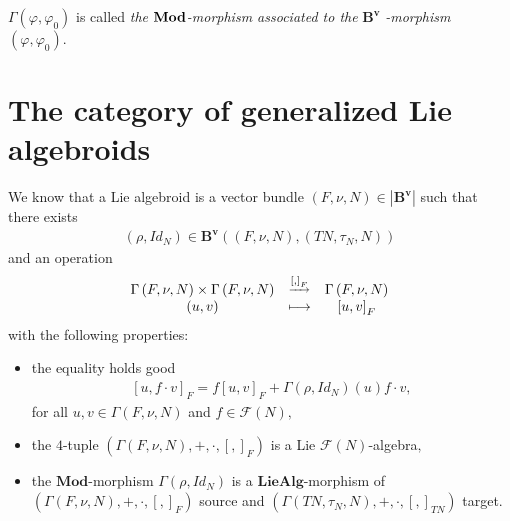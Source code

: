 \documentclass[11pt]{article}
\begin{document}
$\Gamma \left( \varphi ,\varphi _{0}\right) $ is called \emph{the }$\mathbf{%
Mod}$\emph{-morphism associated to the }$\mathbf{B}^{\mathbf{v}}$\emph{%
-morphism }$\left( \varphi ,\varphi _{0}\right) .$

\section{The category of generalized Lie algebroids}

We know that a Lie algebroid is a vector bundle $\left( F,\nu ,N\right) \in
\left\vert \mathbf{B}^{\mathbf{v}}\right\vert $ such that there exists
\begin{equation*}
\begin{array}{c}
\left( \rho ,Id_{N}\right) \in \mathbf{B}^{\mathbf{v}}\left( \left( F,\nu
,N\right) ,\left( TN,\tau _{N},N\right) \right)%
\end{array}%
\end{equation*}%
and an operation
\begin{equation*}
\begin{array}{ccc}
\Gamma \left( F,\nu ,N\right) \times \Gamma \left( F,\nu ,N\right) & ^{%
\underrightarrow{\,\left[ ,\right] _{F}\,}} & \Gamma \left( F,\nu ,N\right)
\\
\left( u,v\right) & \longmapsto & \left[ u,v\right] _{F}%
\end{array}%
\end{equation*}%
with the following properties:

\begin{itemize}
\item[$LA_{1}$.] the equality holds good
\begin{equation*}
\begin{array}{c}
\left[ u,f\cdot v\right] _{F}=f\left[ u,v\right] _{F}+\Gamma \left( \rho
,Id_{N}\right) \left( u\right) f\cdot v,%
\end{array}%
\end{equation*}%
for all $u,v\in \Gamma \left( F,\nu ,N\right) $ and $f\in \mathcal{F}\left(
N\right) ,$

\item[$LA_{2}$.] the $4$-tuple $\left( \Gamma \left( F,\nu ,N\right)
,+,\cdot ,\left[ ,\right] _{F}\right) $ is a Lie $\mathcal{F}\left( N\right)
$-algebra$,$

\item[$LA_{3}$.] the $\mathbf{Mod}$-morphism $\Gamma \left( \rho
,Id_{N}\right) $ is a $\mathbf{LieAlg}$-morphism of $\left( \Gamma \left(
F,\nu ,N\right) ,+,\cdot ,\left[ ,\right] _{F}\right) $ source and $\left(
\Gamma \left( TN,\tau _{N},N\right) ,+,\cdot ,\left[ ,\right] _{TN}\right) $
target.
\end{itemize}
\end{document}
